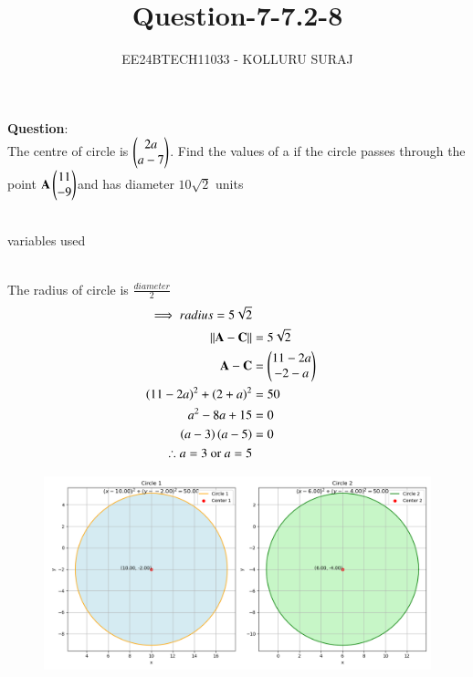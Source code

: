 \documentclass[journal]{IEEEtran}
\numberwithin{equation}{enumi}
\numberwithin{figure}{enumi}
\begin{document}

\title{Question-7-7.2-8}
\author{EE24BTECH11033 - KOLLURU SURAJ}
{\let\newpage\relax\maketitle}
\textbf{Question}:\\
The centre of circle is $\begin{pmatrix}2a\\a-7\end{pmatrix}$. Find the values of a if the circle passes through the point $\mathbf{A}\begin{pmatrix}11\\-9\end{pmatrix}$and has diameter $10\sqrt{2}$ units 
\\
\solution \\
\begin{table}[!ht]
  \centering
  
  \caption{variables used}
\end{table}\\
The radius of circle is $\frac{diameter}{2}$
\begin{align}
    \implies radius=5\sqrt{2}\\
    \left\lVert\mathbf{A}-\mathbf{C}\right\rVert &= 5\sqrt{2}\\
    \mathbf{A}-\mathbf{C} &= \begin{pmatrix}11-2a \\ -2-a\end{pmatrix}\\
    \left(11-2a\right)^2 +\left(2+a\right)^2 &= 50\\
    a^2-8a+15 &= 0\\
    \left(a-3\right)\left(a-5\right)&=0\\
	\therefore  a =3 \text{ or } a = 5
\end{align}
\begin{figure}[!ht]
    \centering
    \includegraphics[width=\linewidth]{figs/Figure_1.png}
    \caption{}
\end{figure}
\end{document}
